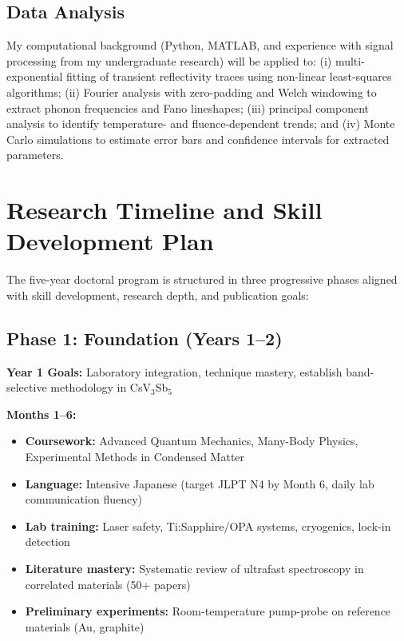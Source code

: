 \documentclass[12pt,a4paper]{article}
\begin{document}
\subsection{Data Analysis}
My computational background (Python, MATLAB, and experience with signal processing from my undergraduate research) will be applied to: (i) multi-exponential fitting of transient reflectivity traces using non-linear least-squares algorithms; (ii) Fourier analysis with zero-padding and Welch windowing to extract phonon frequencies and Fano lineshapes; (iii) principal component analysis to identify temperature- and fluence-dependent trends; and (iv) Monte Carlo simulations to estimate error bars and confidence intervals for extracted parameters.

\section{Research Timeline and Skill Development Plan}

The five-year doctoral program is structured in three progressive phases aligned with skill development, research depth, and publication goals:

\subsection{Phase 1: Foundation (Years 1--2)}

\textbf{Year 1 Goals:} Laboratory integration, technique mastery, establish band-selective methodology in CsV$_3$Sb$_5$

\textbf{Months 1--6:}
\begin{itemize}
    \item \textbf{Coursework:} Advanced Quantum Mechanics, Many-Body Physics, Experimental Methods in Condensed Matter
    \item \textbf{Language:} Intensive Japanese (target JLPT N4 by Month 6, daily lab communication fluency)
    \item \textbf{Lab training:} Laser safety, Ti:Sapphire/OPA systems, cryogenics, lock-in detection
    \item \textbf{Literature mastery:} Systematic review of ultrafast spectroscopy in correlated materials (50+ papers)
    \item \textbf{Preliminary experiments:} Room-temperature pump-probe on reference materials (Au, graphite)
\end{itemize}
\end{document}
